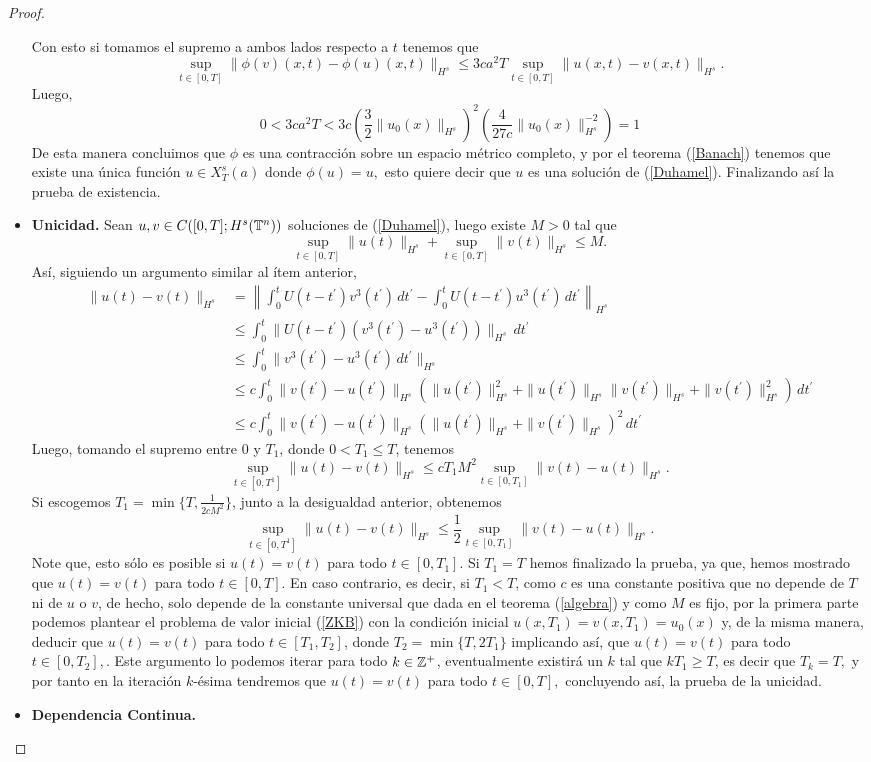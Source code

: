 \begin{proof}
\begin{itemize}
        Con esto si tomamos el supremo a ambos lados respecto a $t$ tenemos que
       $$\sup_{t\in[0,T]}\|\phi(v)(x,t)-\phi(u)(x,t)\|_{H^s}\leq 3ca^2T\sup_{t\in[0,T]}\|u(x,t)-v(x,t)\|_{H^s}.$$
       Luego,
       $$0<3ca^2T<3c\left(\dfrac{3}{2}\|u_0(x)\|_{H^s}\right)^2\left(\dfrac{4}{27c}\|u_0(x)\|^{-2}_{H^s}\right)=1$$
       De esta manera concluimos que $\phi$ es una contracción sobre un espacio métrico completo, y por el teorema (\ref{Banach}) tenemos que existe una única función $u\in X^s_T(a)$ donde $\phi(u)=u,$ esto quiere decir que $u$ es una solución de (\ref{Duhamel}). Finalizando así la prueba de  existencia.
       \item \textbf{Unicidad.} Sean $u,v\in C([0,T];H^s(\mathbb{T}^n))$ soluciones de (\ref{Duhamel}), luego existe $M>0$ tal que
       $$\sup_{t\in[0,T]}\|u(t)\|_{H^s}+\sup_{t\in[0,T]}\|v(t)\|_{H^s}\leq M.$$
       Así, siguiendo un argumento similar al ítem anterior,
       \begin{align*}
           \|u(t)-v(t)\|_{H^s}&=\left\|\int_0^tU(t-t^\prime)v^3(t^\prime)\,dt^\prime-\int_0^tU(t-t^\prime)u^3(t^\prime)\,dt^\prime\right\|_{H^s}\\
           &\leq\int_0^t\|U(t-t^\prime)(v^3(t^\prime)-u^3(t^\prime))\|_{H^s}\,dt^\prime\\
           &\leq\int_0^t\|v^3(t^\prime)-u^3(t^\prime)\,dt^\prime\|_{H^s}\\
           &\leq c\int_0^t\|v(t^\prime)-u(t^\prime)\|_{H^s}(\|u(t^\prime)\|^2_{H^s}+\|u(t^\prime)\|_{H^s}\|v(t^\prime)\|_{H^s}+\|v(t^\prime)\|^2_{H^s})\,dt^\prime\\
           &\leq c\int_0^t\|v(t^\prime)-u(t^\prime)\|_{H^s}(\|u(t^\prime)\|_{H^s}+\|v(t^\prime)\|_{H^s})^2\,dt^\prime
       \end{align*}
       Luego, tomando el supremo entre 0 y $T_1$, donde $0<T_1\leq T$, tenemos
       $$\sup_{t\in[0,T^1]}\|u(t)-v(t)\|_{H^s}\leq cT_1M^2\sup_{t\in[0,T_1]}\|v(t)-u(t)\|_{H^s}. $$
       Si escogemos $T_1=\min\{T,\frac{1}{2cM^2}\}$, junto a la desigualdad anterior, obtenemos
       $$\sup_{t\in[0,T^1]}\|u(t)-v(t)\|_{H^s}\leq \frac{1}{2}\sup_{t\in[0,T_1]}\|v(t)-u(t)\|_{H^s}.$$
       Note que, esto sólo es posible si $u(t)=v(t)$ para todo $t\in[0,T_1].$ Si $T_1=T$ hemos finalizado la prueba, ya que, hemos mostrado que $u(t)=v(t)$ para todo $t\in[0,T].$ En caso contrario, es decir, si $T_1<T$, como $c$ es una constante positiva que no depende de $T$ ni de $u$ o $v$, de hecho, solo depende de la constante universal que dada en el teorema (\ref{algebra}) y como $M$ es fijo, por la primera parte podemos plantear el problema de valor inicial (\ref{ZKB}) con la condición inicial $u(x,T_1)=v(x,T_1)=u_0(x)$ y, de la misma manera, deducir que $u(t)=v(t)$ para todo $t\in[T_1,T_2]$, donde $T_2=\min\{T,2T_1\}$ implicando así, que $u(t)=v(t)$ para todo $t\in[0,T_2],$. Este argumento lo podemos iterar para todo $k\in \mathbb{Z}^+$, eventualmente existirá un $k$ tal que $kT_1\geq T$, es decir que $T_k=T,$ y por tanto en la iteración $k$-ésima tendremos que $u(t)=v(t)$ para todo $t\in[0,T],$ concluyendo así, la prueba de la unicidad.
       \item \textbf{Dependencia Continua.}



\end{itemize}
\end{proof}
